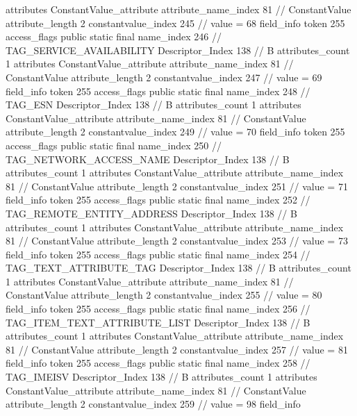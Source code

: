 {{{{{				attributes {
				ConstantValue_attribute {
					attribute_name_index	81		// ConstantValue
					attribute_length	2
					constantvalue_index	245		// value = 68
				}
				}
			}
			field_info {
				token	255
				access_flags	public static final
				name_index	246		// TAG_SERVICE_AVAILABILITY
				Descriptor_Index	138		// B
				attributes_count	1
				attributes {
				ConstantValue_attribute {
					attribute_name_index	81		// ConstantValue
					attribute_length	2
					constantvalue_index	247		// value = 69
				}
				}
			}
			field_info {
				token	255
				access_flags	public static final
				name_index	248		// TAG_ESN
				Descriptor_Index	138		// B
				attributes_count	1
				attributes {
				ConstantValue_attribute {
					attribute_name_index	81		// ConstantValue
					attribute_length	2
					constantvalue_index	249		// value = 70
				}
				}
			}
			field_info {
				token	255
				access_flags	public static final
				name_index	250		// TAG_NETWORK_ACCESS_NAME
				Descriptor_Index	138		// B
				attributes_count	1
				attributes {
				ConstantValue_attribute {
					attribute_name_index	81		// ConstantValue
					attribute_length	2
					constantvalue_index	251		// value = 71
				}
				}
			}
			field_info {
				token	255
				access_flags	public static final
				name_index	252		// TAG_REMOTE_ENTITY_ADDRESS
				Descriptor_Index	138		// B
				attributes_count	1
				attributes {
				ConstantValue_attribute {
					attribute_name_index	81		// ConstantValue
					attribute_length	2
					constantvalue_index	253		// value = 73
				}
				}
			}
			field_info {
				token	255
				access_flags	public static final
				name_index	254		// TAG_TEXT_ATTRIBUTE_TAG
				Descriptor_Index	138		// B
				attributes_count	1
				attributes {
				ConstantValue_attribute {
					attribute_name_index	81		// ConstantValue
					attribute_length	2
					constantvalue_index	255		// value = 80
				}
				}
			}
			field_info {
				token	255
				access_flags	public static final
				name_index	256		// TAG_ITEM_TEXT_ATTRIBUTE_LIST
				Descriptor_Index	138		// B
				attributes_count	1
				attributes {
				ConstantValue_attribute {
					attribute_name_index	81		// ConstantValue
					attribute_length	2
					constantvalue_index	257		// value = 81
				}
				}
			}
			field_info {
				token	255
				access_flags	public static final
				name_index	258		// TAG_IMEISV
				Descriptor_Index	138		// B
				attributes_count	1
				attributes {
				ConstantValue_attribute {
					attribute_name_index	81		// ConstantValue
					attribute_length	2
					constantvalue_index	259		// value = 98
				}
				}
			}
			field_info {
}}}}}
